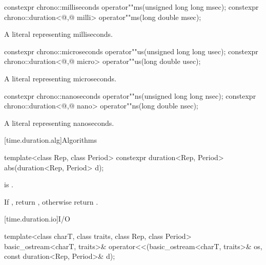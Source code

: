 %
\begin{itemdecl}
constexpr chrono::milliseconds                 operator""ms(unsigned long long msec);
constexpr chrono::duration<@\unspec,@ milli> operator""ms(long double msec);
\end{itemdecl}

\begin{itemdescr}
\pnum
\returns
A  literal representing  milliseconds.
\end{itemdescr}

%
\begin{itemdecl}
constexpr chrono::microseconds                 operator""us(unsigned long long usec);
constexpr chrono::duration<@\unspec,@ micro> operator""us(long double usec);
\end{itemdecl}

\begin{itemdescr}
\pnum
\returns
A  literal representing  microseconds.
\end{itemdescr}

%
\begin{itemdecl}
constexpr chrono::nanoseconds                 operator""ns(unsigned long long nsec);
constexpr chrono::duration<@\unspec,@ nano> operator""ns(long double nsec);
\end{itemdecl}

\begin{itemdescr}
\pnum
\returns
A  literal representing  nanoseconds.
\end{itemdescr}

[time.duration.alg]{Algorithms}

%
\begin{itemdecl}
template<class Rep, class Period>
  constexpr duration<Rep, Period> abs(duration<Rep, Period> d);
\end{itemdecl}

\begin{itemdescr}
\pnum
\constraints
{} is .

\pnum
\returns
If , return ,
otherwise return .
\end{itemdescr}

[time.duration.io]{I/O}

%
\begin{itemdecl}
template<class charT, class traits, class Rep, class Period>
  basic_ostream<charT, traits>&
    operator<<(basic_ostream<charT, traits>& os, const duration<Rep, Period>& d);
\end{itemdecl}

